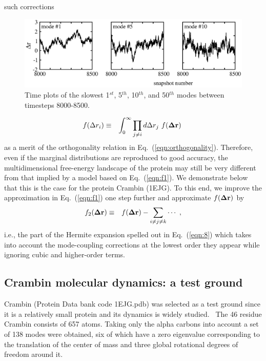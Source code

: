 \documentclass[12pt]{iopart}
\begin{document}
such corrections
\begin{figure}[t!]
  \includegraphics[width=.90\textwidth]{fig2.eps}
\caption{Time plots of the slowest 1$^{st}$, 5$^{th}$, 10$^{th}$, and 50$^{th}$ modes between timesteps 8000-8500.}
\label{fig:timeplots}
\end{figure}
\begin{eqnarray}
\label{marginal}
f(\Delta r_i) &\equiv& \int_0^\infty \prod_{j\ne i}d\Delta r_j\ f({\bf\Delta r})\ 
\end{eqnarray}
as a merit of the orthogonality relation in
Eq.~(\ref{eqn:orthogonality}). Therefore, even if the marginal
distributions are reproduced to good accuracy, the multidimensional
free-energy landscape of the protein may still be very different from
that implied by a model based on Eq.~(\ref{eqn:f1}). We demonstrate
below that this is the case for the protein Crambin (1EJG). To this end,
we improve the approximation in Eq.~(\ref{eqn:f1}) one step
further and approximate $f({\bf\Delta r})$ by
\begin{eqnarray}
\label{eqn:f2}
f_2({\bf\Delta r}) &\equiv& f({\bf\Delta r}) - \sum_{i\ne j\ne k}\cdots\ ,
\end{eqnarray}
i.e., the part of the Hermite expansion spelled out in Eq.~(\ref{eqn:8})
which takes into account the mode-coupling corrections at the lowest
order they appear while ignoring cubic and higher-order terms.

\subsection{Crambin molecular dynamics: a test ground}

Crambin (Protein Data bank code 1EJG.pdb) was selected as a test
ground since it is a relatively small protein and its dynamics is
widely
studied.~\cite{teeter1990harmonic,levitt1985protein,lange2006can} The
46 residue Crambin consists of 657 atoms. Taking only the alpha
carbons into account a set of 138 modes were obtained, six of which
have a zero eigenvalue corresponding to the translation of the center of mass 
and three global rotational degrees of freedom around it. 
\end{document}
